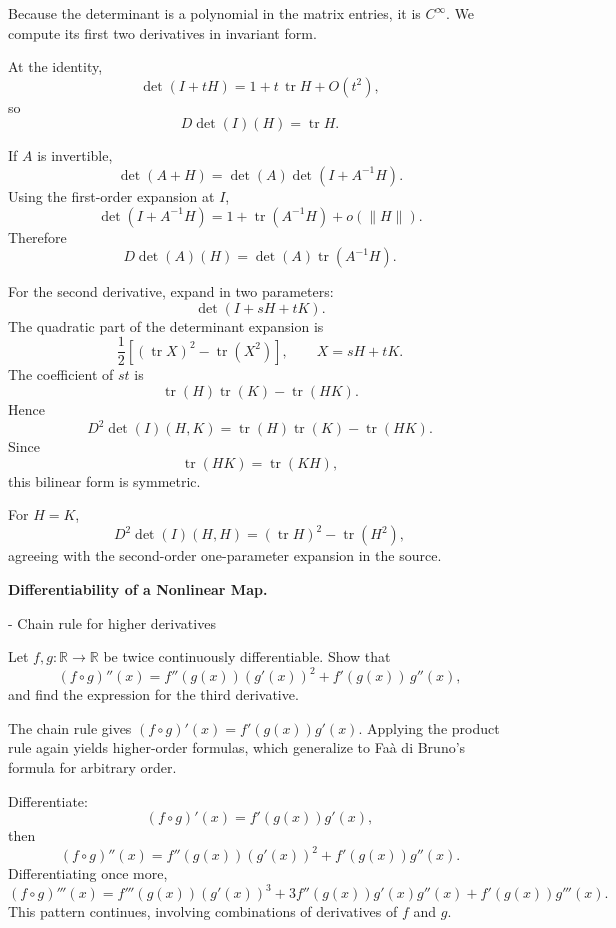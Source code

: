 \begin{solution}
Because the determinant is a polynomial in the matrix entries, it is \(C^\infty\). We compute
its first two derivatives in invariant form.

At the identity,
\[
\det(I+tH)
=
1+t\,\operatorname{tr}H+O(t^2),
\]
so
\[
\boxed{
D\det(I)(H)=\operatorname{tr}H.
}
\]

If \(A\) is invertible,
\[
\det(A+H)
=
\det(A)\det(I+A^{-1}H).
\]
Using the first-order expansion at \(I\),
\[
\det(I+A^{-1}H)
=
1+\operatorname{tr}(A^{-1}H)+o(\|H\|).
\]
Therefore
\[
\boxed{
D\det(A)(H)
=
\det(A)\operatorname{tr}(A^{-1}H).
}
\]

For the second derivative, expand in two parameters:
\[
\det(I+sH+tK).
\]
The quadratic part of the determinant expansion is
\[
\frac12
\left[
(\operatorname{tr}X)^2-\operatorname{tr}(X^2)
\right],
\qquad
X=sH+tK.
\]
The coefficient of \(st\) is
\[
\operatorname{tr}(H)\operatorname{tr}(K)
-
\operatorname{tr}(HK).
\]
Hence
\[
\boxed{
D^2\det(I)(H,K)
=
\operatorname{tr}(H)\operatorname{tr}(K)
-
\operatorname{tr}(HK).
}
\]
Since
\[
\operatorname{tr}(HK)=\operatorname{tr}(KH),
\]
this bilinear form is symmetric.

For \(H=K\),
\[
D^2\det(I)(H,H)
=
(\operatorname{tr}H)^2-\operatorname{tr}(H^2),
\]
agreeing with the second-order one-parameter expansion in the source.
\end{solution}


\begin{problem}[CP-II-0429]
\label{prob:cp-ii-0429}
\textbf{Differentiability of a Nonlinear Map.}

\hspace*{1.5em}- Chain rule for higher derivatives

Let $f,g:\mathbb{R}\to\mathbb{R}$ be twice continuously differentiable.
Show that
\[
(f\circ g)''(x) = f''(g(x))(g'(x))^2 + f'(g(x))\,g''(x),
\]
and find the expression for the third derivative.

The chain rule gives $(f\circ g)'(x)=f'(g(x))g'(x)$.
Applying the product rule again yields higher-order formulas,
which generalize to Fa\`a di Bruno's formula for arbitrary order.
\end{problem}

\begin{solution}
Differentiate:
\[
(f\circ g)'(x)=f'(g(x))g'(x),
\]
then
\[
(f\circ g)''(x)=f''(g(x))(g'(x))^2+f'(g(x))g''(x).
\]
Differentiating once more,
\[
(f\circ g)'''(x)=f'''(g(x))(g'(x))^3
+3f''(g(x))g'(x)g''(x)
+f'(g(x))g'''(x).
\]
This pattern continues, involving combinations of derivatives of $f$ and $g$.
\end{solution}

